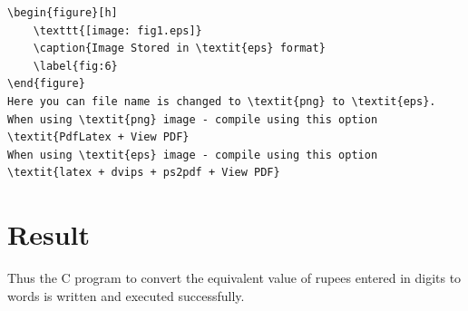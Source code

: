 \documentclass[a4paper,10pt]{article}
\begin{document}
\begin{verbatim}
\begin{figure}[h]
	\texttt{[image: fig1.eps]}
	\caption{Image Stored in \textit{eps} format}
	\label{fig:6}
\end{figure}
Here you can file name is changed to \textit{png} to \textit{eps}.
When using \textit{png} image - compile using this option \textit{PdfLatex + View PDF}
When using \textit{eps} image - compile using this option \textit{latex + dvips + ps2pdf + View PDF}
\end{verbatim}

\section{Result}
Thus the C program to convert the equivalent value of rupees entered in digits to words is written and executed successfully. 
\end{document}
